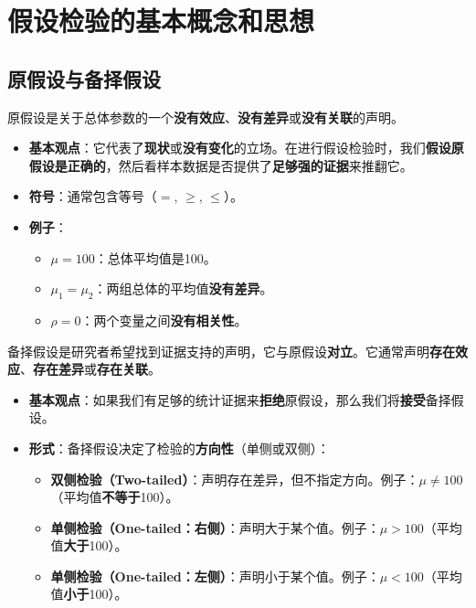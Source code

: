 \section{假设检验的基本概念和思想}
\subsection{原假设与备择假设}
\begin{definition}
原假设是关于总体参数的一个\textbf{没有效应}、\textbf{没有差异}或\textbf{没有关联}的声明。
\begin{itemize}
	\item \textbf{基本观点}：它代表了\textbf{现状}或\textbf{没有变化}的立场。在进行假设检验时，我们\textbf{假设原假设是正确的}，然后看样本数据是否提供了\textbf{足够强的证据}来推翻它。
	\item \textbf{符号}：通常包含等号（$=$, $\ge$, $\le$）。
	\item \textbf{例子}：
	\begin{itemize}
		\item $\mu = 100$：总体平均值是100。
		\item $\mu_1 = \mu_2$：两组总体的平均值\textbf{没有差异}。
		\item $\rho = 0$：两个变量之间\textbf{没有相关性}。
	\end{itemize}
\end{itemize}
\end{definition}

\begin{definition}
备择假设是研究者希望找到证据支持的声明，它与原假设\textbf{对立}。它通常声明\textbf{存在效应}、\textbf{存在差异}或\textbf{存在关联}。
\begin{itemize}
	\item \textbf{基本观点}：如果我们有足够的统计证据来\textbf{拒绝}原假设，那么我们将\textbf{接受}备择假设。
	\item \textbf{形式}：备择假设决定了检验的\textbf{方向性}（单侧或双侧）：
	\begin{itemize}
		\item \textbf{双侧检验（Two-tailed）}：声明存在差异，但不指定方向。例子：$\mu \neq 100$（平均值\textbf{不等于}100）。
		\item \textbf{单侧检验（One-tailed：右侧）}：声明大于某个值。例子：$\mu > 100$（平均值\textbf{大于}100）。
		\item \textbf{单侧检验（One-tailed：左侧）}：声明小于某个值。例子：$\mu < 100$（平均值\textbf{小于}100）。
	\end{itemize}
\end{itemize}
\end{definition}

